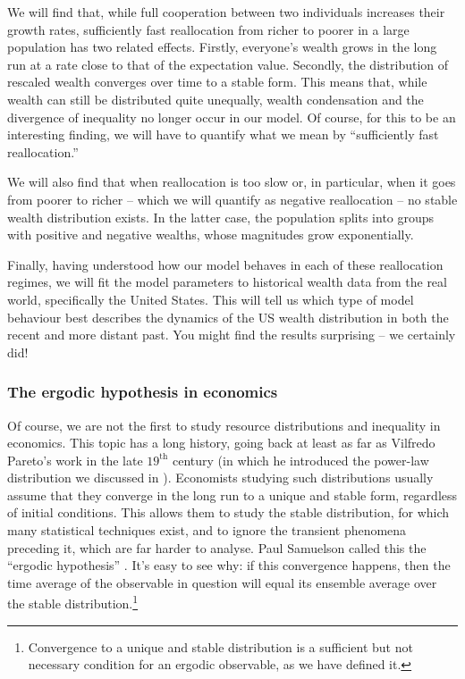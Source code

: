 We will find that, while full cooperation between two individuals increases their growth rates, sufficiently fast reallocation from richer to poorer in a large population has two related effects. Firstly, everyone's wealth grows in the long run at a rate close to that of the expectation value. Secondly, the distribution of rescaled wealth converges over time to a stable form. This means that, while wealth can still be distributed quite unequally, wealth condensation and the divergence of inequality no longer occur in our model. Of course, for this to be an interesting finding, we will have to quantify what we mean by ``sufficiently fast reallocation.''

We will also find that when reallocation is too slow or, in particular, when it goes from poorer to richer -- which we will quantify as negative reallocation -- no stable wealth distribution exists. In the latter case, the population splits into groups with positive and negative wealths, whose magnitudes grow exponentially.

Finally, having understood how our model behaves in each of these reallocation regimes, we will fit the model parameters to historical wealth data from the real world, specifically the United States. This will tell us which type of model behaviour best describes the dynamics of the US wealth distribution in both the recent and more distant past. You might find the results surprising -- we certainly did!


\subsubsection{The ergodic hypothesis in economics}
Of course, we are not the first to study resource distributions and inequality in economics. This topic has a long history, going back at least as far as Vilfredo Pareto's work in the late $19^\text{th}$ century \cite{Pareto1897} (in which he introduced the power-law distribution we discussed in ). Economists studying such distributions usually assume that they converge in the long run to a unique and stable form, regardless of initial conditions. This allows them to study the stable distribution, for which many statistical techniques exist, and to ignore the transient phenomena preceding it, which are far harder to analyse. Paul Samuelson called this the ``ergodic hypothesis'' \cite[pp.~11-12]{Samuelson1968}. It's easy to see why: if this convergence happens, then the time average of the observable in question will equal its ensemble average over the stable distribution.\footnote{Convergence to a unique and stable distribution is a sufficient but not necessary condition for an ergodic observable, as we have defined it.}

